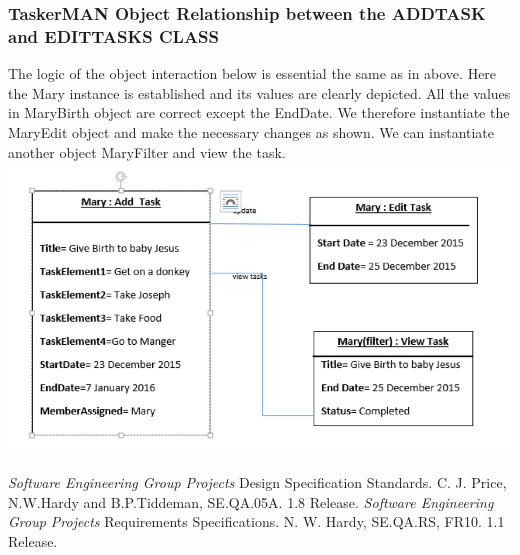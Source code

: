 \documentclass{project}
\begin{document}
\subsubsection{TaskerMAN Object Relationship between the ADD\textunderscore TASK and EDIT\textunderscore TASKS CLASS}
The logic of the object interaction below is essential the same as in above. Here the Mary instance is established and its values are clearly depicted.  All the values in MaryBirth object are correct except the EndDate.  We therefore instantiate the MaryEdit object and make the necessary changes as shown. We can instantiate another object MaryFilter and view the task. \\
\includegraphics[width=1\textwidth, center]{images/Detailed-Design/TaskerMANObjectDiagram2} \\
\begin{thebibliography}{12}
 \emph{Software Engineering Group Projects}
Design Specification Standards.
C. J. Price, N.W.Hardy and B.P.Tiddeman, SE.QA.05A. 1.8 Release.
 \emph{Software Engineering Group Projects}
Requirements Specifications.
N. W. Hardy, SE.QA.RS, FR10. 1.1 Release.
\end{thebibliography}
\clearpage
{}
\end{document}

